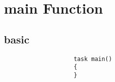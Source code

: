 \chapter{main Function}
\section{basic}

	\begin{lstlisting}
					task main()
					{
					}
  \end{lstlisting}
